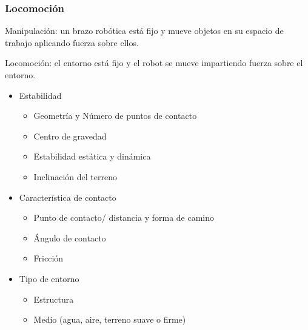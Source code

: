 \begin{frame}
    \frametitle{Locomoción}

    Manipulación: un brazo robótica está fijo y mueve objetos en su espacio de trabajo aplicando fuerza sobre ellos.

    Locomoción: el entorno está fijo y el robot se mueve impartiendo fuerza sobre el entorno.
    \begin{itemize}
        \item Estabilidad
        \begin{itemize}
            \item Geometría y Número de puntos de contacto
            \item Centro de gravedad
            \item Estabilidad estática y dinámica
            \item Inclinación del terreno
        \end{itemize}
        \item Característica de contacto
        \begin{itemize}
            \item Punto de contacto/ distancia y forma de camino
            \item Ángulo de contacto
            \item Fricción
        \end{itemize}
        \item Tipo de entorno
        \begin{itemize}
            \item Estructura
            \item Medio (agua, aire, terreno suave o firme)
        \end{itemize}
    \end{itemize}
\end{frame}

